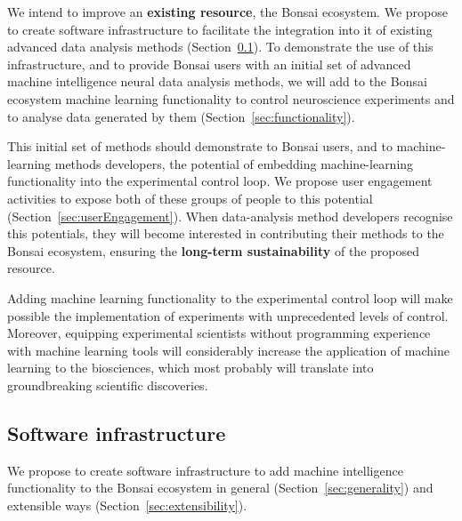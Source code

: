 
We intend to improve an \textbf{existing resource}, the Bonsai ecosystem. We
propose to create software infrastructure to facilitate the integration into it
of existing advanced data analysis methods
(Section~\ref{sec:softwareInfrastructure}).
%
To demonstrate the use of this infrastructure, and to provide Bonsai users with
an initial set of advanced machine intelligence neural data analysis methods,
we will add to the Bonsai ecosystem machine learning functionality to control
neuroscience experiments and to analyse data generated by them
(Section~\ref{sec:functionality}).

This initial set of methods should demonstrate to Bonsai users, and to
machine-learning methods developers, the potential of embedding
machine-learning functionality into the experimental control loop. We propose
user engagement activities to expose both of these groups of people to this
potential (Section~\ref{sec:userEngagement}).  When data-analysis method
developers recognise this potentials, they will become interested in
contributing their methods to the Bonsai ecosystem, ensuring the
\textbf{long-term sustainability} of the proposed resource.

Adding machine learning functionality to the experimental control loop will
make possible the implementation of experiments with unprecedented levels of
control. Moreover, equipping experimental scientists without programming
experience with machine learning tools will considerably increase the
application of machine learning to the biosciences, which most probably will
translate into groundbreaking scientific discoveries.

\subsection{Software infrastructure}
\label{sec:softwareInfrastructure}

We propose to create software infrastructure to add machine intelligence
functionality to the Bonsai ecosystem in general
(Section~\ref{sec:generality}) and extensible ways
(Section~\ref{sec:extensibility}).

